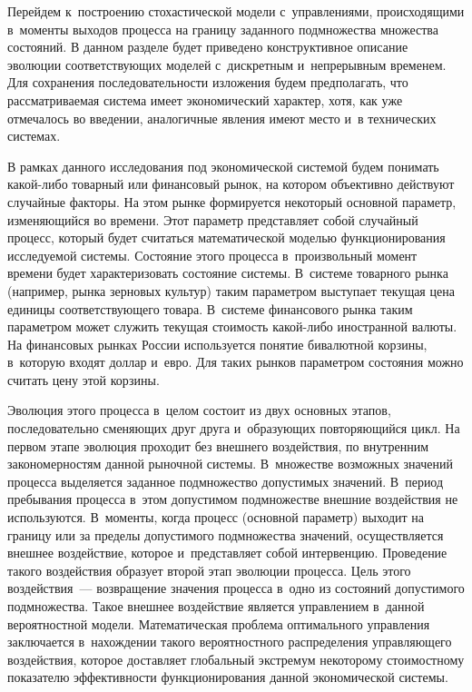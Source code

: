 \begin{multicols}{2}
\vspace*{-3pt}


Перейдем к~построению стохастической модели с~управлениями, происходящими 
в~моменты выходов процесса на границу заданного подмножества множества состояний. 
В данном разделе будет приведено конструктивное описание эволюции   
соответствующих моделей с~дискретным и~непрерывным временем. Для сохранения 
последовательности изложения будем предполагать, что рас\-смат\-ри\-ва\-емая система 
имеет экономический характер, хотя, как уже отмечалось во введении, аналогичные 
явления имеют место и~в технических системах.

В рамках данного исследования под экономической системой будем понимать 
ка\-кой-ли\-бо товарный или финансовый рынок, на котором объективно действуют случайные 
факторы. На этом рынке формируется некоторый основной параметр, изменяющийся во 
времени. Этот параметр представляет собой случайный процесс, который будет\linebreak 
считаться математической моделью функ\-цио\-ни\-рования исследуемой системы. Состояние 
этого процесса в~произвольный момент времени будет характеризовать состояние 
системы.
В~системе товарного рынка (например,  рынка зерновых культур) таким параметром 
выступает текущая цена единицы соответствующего товара.
В~системе финансового рынка таким параметром может служить текущая стоимость 
ка\-кой-ли\-бо иностранной валюты. На финансовых рынках России используется понятие 
бивалютной корзины, в~которую входят доллар и~евро. Для таких рынков параметром 
состояния можно считать цену этой корзины.

Эволюция этого процесса в~целом
состоит из двух основных этапов, последовательно сме\-ня\-ющих 
друг друга и~обра\-зу\-ющих повторяющийся цикл. На первом этапе эволюция проходит без
внеш\-не\-го воздействия, по внутренним закономерностям данной рыночной
системы. В~множестве возможных значений процесса выделяется заданное
подмножество допустимых значений. В~период пребывания процесса в~этом
допустимом подмножестве внешние воздействия не используются. В~моменты,
когда процесс (основной параметр) выходит на границу или за пределы
до\-пус\-ти\-мо\-го подмножества значений, осуществляется внешнее воздействие,
которое и~пред\-став\-ля\-ет собой интервенцию. Проведение такого воздействия образует 
второй этап эволюции процесса. Цель этого воздействия~--- возвращение значения 
процесса в~одно из состояний допустимого
подмножества. Такое внешнее воздействие является управлением в~данной
вероятностной модели.
Математическая проблема оптимального управления заключается в~нахождении такого 
вероятностного распределения управляющего воздействия, которое доставляет 
глобальный экстремум некоторому стоимостному показателю эффективности 
функционирования данной экономической системы.


\end{multicols}
